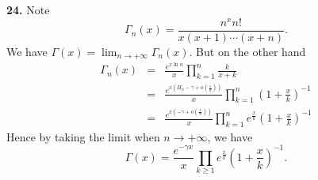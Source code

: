 \documentclass[a4paper,12pt]{article}
\newcommand{\newpar}[1]{\bigskip \noindent \textbf{#1.}}
\begin{document}
\newpar{24}  Note
\[\Gamma_n(x) = \frac{n^x n!}{x(x+1)\cdots(x+n)}.\]
We have $\Gamma(x) = \lim_{n \to +\infty} \Gamma_n(x)$.  But on the
other hand
\begin{eqnarray*}
  \Gamma_n(x) &=& \frac{e^{x\ln n}}{x} \prod_{k=1}^n \frac{k}{x+k} \\
  &=& \frac{e^{x\left(H_n - \gamma +
      o\left(\frac{1}{n}\right)\right)}}{x} \prod_{k=1}^n \left(1 +
  \frac{x}{k}\right)^{-1}\\
  &=& \frac{e^{x\left(-\gamma + o\left(\frac{1}{n}\right)\right)}}{x}
  \prod_{k=1}^n e^{\frac{x}{k}}\left(1 + \frac{x}{k}\right)^{-1}
\end{eqnarray*}
Hence by taking the limit when $n \to +\infty$, we have
\[\Gamma(x) = \frac{e^{-\gamma x}}{x} \prod_{k\ge 1} e^{\frac{x}{k}}
\left(1 + \frac{x}{k}\right)^{-1}.\]
\end{document}
